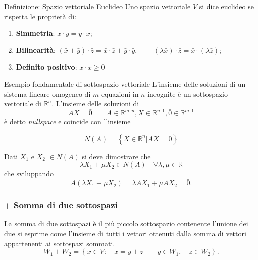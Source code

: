 \documentclass[x11names]{article}
\begin{document}
	\begin{center}
	\colorbox{myblue}{\begin{minipage}{5.75in}
			\begin{blues}{Definizione: Spazio vettoriale Euclideo}
				Uno spazio vettoriale $V$ si dice euclideo se rispetta le proprietà di:
				\begin{enumerate}
					\item \textbf{Simmetria}: $\bar{x} \cdot \bar{y} = \bar{y} \cdot \bar{x}$;
					\item \textbf{Bilinearità}: $\left(\bar{x} + \bar{y}\right) \cdot \bar{z} = \bar{x} \cdot \bar{z} + \bar{y} \cdot \bar{y}$, $\qquad \left(\lambda \bar{x}\right) \cdot \bar{z} = \bar{x} \cdot \left(\lambda \bar{z}\right)$;
					\item \textbf{Definito positivo}: $\bar{x} \cdot \bar{x} \geq 0$
				\end{enumerate}
			\end{blues}
	\end{minipage}}       
\end{center}

\begin{es}{Esempio fondamentale di sottospazio vettoriale}
L'insieme delle soluzioni di un sistema lineare omogeneo di $m$ equazioni in $n$ incognite è un sottospazio vettoriale di $\mathbb{R}^n$. L'insieme delle soluzioni di 
\[
AX = \bar{0} \qquad A \in \mathbb{R}^{m,n}, X \in \mathbb{R}^{n,1}, \bar{0} \in \mathbb{R}^{m,1}
\] 
è detto \textit{nullspace} e coincide con l'insieme

\[
N\left(A\right) = \left\{ X \in \mathbb{R}^n | AX = \bar{0}  \right\}
\]

Dati $X_1$ e $X_2$ $\in N\left(A\right)$ si deve dimostrare che 
\[
\lambda X_1 + \mu X_2 \in N\left(A\right) \quad \forall \lambda,\mu \in \mathbb{R}
\] 
che sviluppando
\[
A\left(\lambda X_1 + \mu X_2\right) = \lambda AX_1 + \mu AX_2 = \bar{0}
.\] 
\end{es}


\subsubsection{$+$ Somma di due sottospazi}
La somma di due sottospazi è il più piccolo sottospazio contenente l'unione dei due si esprime come l'insieme di tutti i vettori ottenuti dalla somma di vettori appartenenti ai sottospazi sommati.
\[
W_1 + W_2  = \left\{\bar{x} \in V: \quad \bar{x} = \bar{y}+\bar{z}  \qquad y \in W_1, \quad z \in W_2\right\}
.\] 
\end{document}
